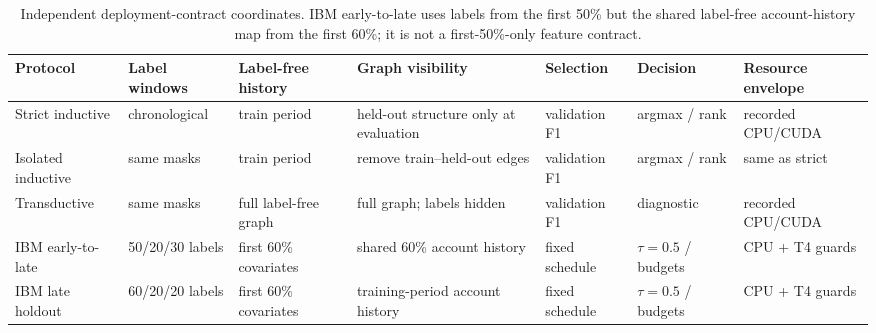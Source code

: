 \begin{table}[t]
\caption{Independent deployment-contract coordinates. IBM early-to-late uses labels from the first 50\% but the shared label-free account-history map from the first 60\%; it is not a first-50\%-only feature contract.}
\label{tab:protocol-visibility}
\centering
\footnotesize
\setlength{\tabcolsep}{2.5pt}
\begin{tabularx}{\textwidth}{@{}p{}p{}p{}p{}p{}p{}X@{}}
\toprule
Protocol & Label windows & Label-free history & Graph visibility & Selection & Decision & Resource envelope \\
\midrule
Strict inductive & chronological & train period & held-out structure only at evaluation & validation F1 & argmax / rank & recorded CPU/CUDA \\
Isolated inductive & same masks & train period & remove train--held-out edges & validation F1 & argmax / rank & same as strict \\
Transductive & same masks & full label-free graph & full graph; labels hidden & validation F1 & diagnostic & recorded CPU/CUDA \\
IBM early-to-late & 50/20/30 labels & first 60\% covariates & shared 60\% account history & fixed schedule & $\tau=0.5$ / budgets & CPU + T4 guards \\
IBM late holdout & 60/20/20 labels & first 60\% covariates & training-period account history & fixed schedule & $\tau=0.5$ / budgets & CPU + T4 guards \\
\bottomrule
\end{tabularx}
\end{table}
